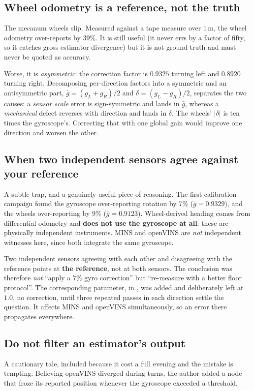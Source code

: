 \subsection{Wheel odometry is a reference, not the truth}
\label{ap:repro-wheels}
The mecanum wheels slip. Measured against a tape measure over $1$\,m, the
wheel odometry over-reports by $39\%$. It is still useful (it never errs by
a factor of fifty, so it catches gross estimator divergence) but it is not
ground truth and must never be quoted as accuracy.

Worse, it is \emph{asymmetric}: the correction factor is $0.9325$ turning left
and $0.8920$ turning right. Decomposing per-direction factors into a
symmetric and an antisymmetric part,
$\bar g = (g_L+g_R)/2$ and $\delta = (g_L-g_R)/2$, separates the two causes: a
\emph{sensor scale} error is sign-symmetric and lands in $\bar g$, whereas a
\emph{mechanical} defect reverses with direction and lands in $\delta$. The
wheels' $\lvert\delta\rvert$ is ten times the gyroscope's. Correcting that
with one global gain would improve one direction and worsen the other.

\subsection{When two independent sensors agree against your reference}
\label{ap:repro-indep}
A subtle trap, and a genuinely useful piece of reasoning. The first
calibration campaign found the gyroscope over-reporting rotation by $7\%$
($\bar g = 0.9329$), and the wheels over-reporting by $9\%$
($\bar g = 0.9123$). Wheel-derived heading comes from differential odometry and
\textbf{does not use the gyroscope at all}: these are physically independent
instruments. MINS and openVINS are \emph{not} independent witnesses here, since
both integrate the same gyroscope.

Two independent sensors agreeing with each other and disagreeing with the
reference points at \textbf{the reference}, not at both sensors. The
conclusion was therefore \emph{not} ``apply a $7\%$ gyro correction'' but
``re-measure with a better floor protocol''. The corresponding parameter,
 in , was added and
deliberately left at $1.0$, no correction, until three repeated passes
in each direction settle the question. It affects MINS and openVINS
simultaneously, so an error there propagates everywhere.

\subsection{Do not filter an estimator's output}
\label{ap:repro-guard}
A cautionary tale, included because it cost a full evening and the mistake is
tempting. Believing openVINS diverged during turns, the author added a node
that froze its reported position whenever the gyroscope exceeded a threshold.

